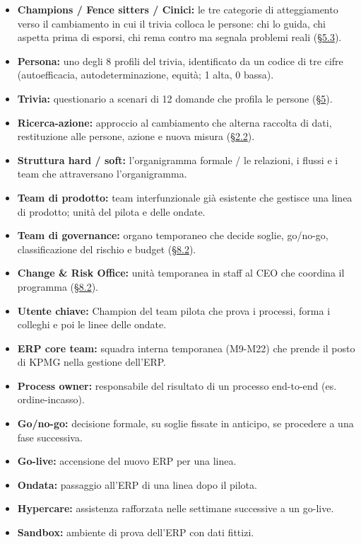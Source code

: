 \documentclass[11pt,a4paper]{article}
\begin{document}
\begin{itemize}
\item \textbf{Champions / Fence sitters / Cinici:} le tre categorie di atteggiamento verso il cambiamento in cui il trivia colloca le persone: chi lo guida, chi aspetta prima di esporsi, chi rema contro ma segnala problemi reali (\hyperref[sec:5.3]{\S5.3}).
\item \textbf{Persona:} uno degli 8 profili del trivia, identificato da un codice di tre cifre (autoefficacia, autodeterminazione, equità; 1 alta, 0 bassa).
\item \textbf{Trivia:} questionario a scenari di 12 domande che profila le persone (\hyperref[sec:5]{\S5}).
\item \textbf{Ricerca-azione:} approccio al cambiamento che alterna raccolta di dati, restituzione alle persone, azione e nuova misura (\hyperref[sec:2.2]{\S2.2}).
\item \textbf{Struttura hard / soft:} l'organigramma formale / le relazioni, i flussi e i team che attraversano l'organigramma.
\item \textbf{Team di prodotto:} team interfunzionale già esistente che gestisce una linea di prodotto; unità del pilota e delle ondate.
\item \textbf{Team di governance:} organo temporaneo che decide soglie, go/no-go, classificazione del rischio e budget (\hyperref[sec:8.2]{\S8.2}).
\item \textbf{Change \& Risk Office:} unità temporanea in staff al CEO che coordina il programma (\hyperref[sec:8.2]{\S8.2}).
\item \textbf{Utente chiave:} Champion del team pilota che prova i processi, forma i colleghi e poi le linee delle ondate.
\item \textbf{ERP core team:} squadra interna temporanea (M9-M22) che prende il posto di KPMG nella gestione dell'ERP.
\item \textbf{Process owner:} responsabile del risultato di un processo end-to-end (es. ordine-incasso).
\item \textbf{Go/no-go:} decisione formale, su soglie fissate in anticipo, se procedere a una fase successiva.
\item \textbf{Go-live:} accensione del nuovo ERP per una linea.
\item \textbf{Ondata:} passaggio all'ERP di una linea dopo il pilota.
\item \textbf{Hypercare:} assistenza rafforzata nelle settimane successive a un go-live.
\item \textbf{Sandbox:} ambiente di prova dell'ERP con dati fittizi.

\end{itemize}
\end{document}
